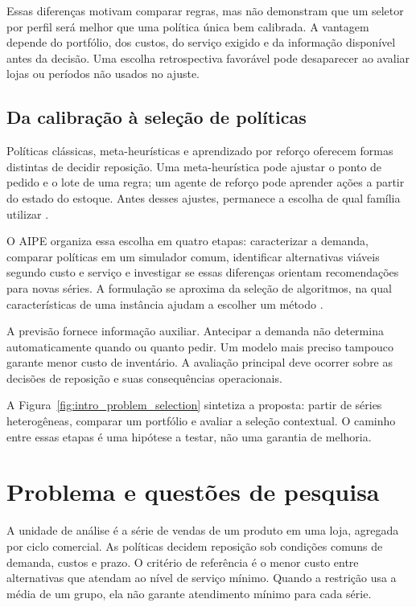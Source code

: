 Essas diferenças motivam comparar regras, mas não demonstram que um seletor por perfil será melhor que uma política única bem calibrada. A vantagem depende do portfólio, dos custos, do serviço exigido e da informação disponível antes da decisão. Uma escolha retrospectiva favorável pode desaparecer ao avaliar lojas ou períodos não usados no ajuste.

\subsection{Da calibração à seleção de políticas}

Políticas clássicas, meta-heurísticas e aprendizado por reforço oferecem formas distintas de decidir reposição. Uma meta-heurística pode ajustar o ponto de pedido e o lote de uma regra; um agente de reforço pode aprender ações a partir do estado do estoque. Antes desses ajustes, permanece a escolha de qual família utilizar \citep{Syntetos2012DemandClassificationsApplications,Boute2022DRLInventoryRoadmap}.

O AIPE organiza essa escolha em quatro etapas: caracterizar a demanda, comparar políticas em um simulador comum, identificar alternativas viáveis segundo custo e serviço e investigar se essas diferenças orientam recomendações para novas séries. A formulação se aproxima da seleção de algoritmos, na qual características de uma instância ajudam a escolher um método \citep{Rice1976AlgorithmSelection,Kotthoff2014AlgorithmSelection}.

A previsão fornece informação auxiliar. Antecipar a demanda não determina automaticamente quando ou quanto pedir. Um modelo mais preciso tampouco garante menor custo de inventário. A avaliação principal deve ocorrer sobre as decisões de reposição e suas consequências operacionais.

A Figura~\ref{fig:intro_problem_selection} sintetiza a proposta: partir de séries heterogêneas, comparar um portfólio e avaliar a seleção contextual. O caminho entre essas etapas é uma hipótese a testar, não uma garantia de melhoria.



\section{Problema e questões de pesquisa}

A unidade de análise é a série de vendas de um produto em uma loja, agregada por ciclo comercial. As políticas decidem reposição sob condições comuns de demanda, custos e prazo. O critério de referência é o menor custo entre alternativas que atendam ao nível de serviço mínimo. Quando a restrição usa a média de um grupo, ela não garante atendimento mínimo para cada série.


